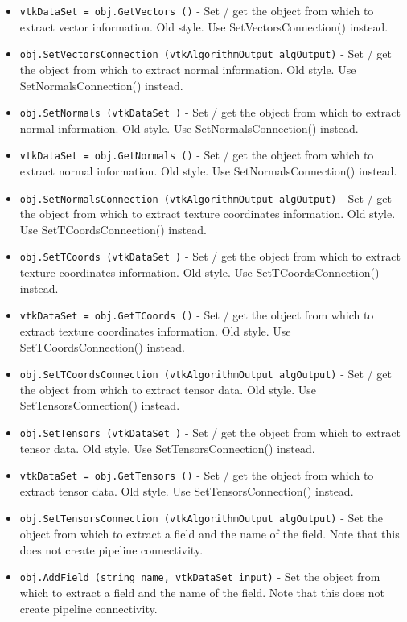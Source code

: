 \begin{itemize}
\item  \verb|vtkDataSet = obj.GetVectors ()| -  Set / get the object from which to extract vector information.
 Old style. Use SetVectorsConnection() instead.

\item  \verb|obj.SetVectorsConnection (vtkAlgorithmOutput algOutput)| -  Set / get the object from which to extract normal information.
 Old style. Use SetNormalsConnection() instead.

\item  \verb|obj.SetNormals (vtkDataSet )| -  Set / get the object from which to extract normal information.
 Old style. Use SetNormalsConnection() instead.

\item  \verb|vtkDataSet = obj.GetNormals ()| -  Set / get the object from which to extract normal information.
 Old style. Use SetNormalsConnection() instead.

\item  \verb|obj.SetNormalsConnection (vtkAlgorithmOutput algOutput)| -  Set / get the object from which to extract texture coordinates
 information.
 Old style. Use SetTCoordsConnection() instead.

\item  \verb|obj.SetTCoords (vtkDataSet )| -  Set / get the object from which to extract texture coordinates
 information.
 Old style. Use SetTCoordsConnection() instead.

\item  \verb|vtkDataSet = obj.GetTCoords ()| -  Set / get the object from which to extract texture coordinates
 information.
 Old style. Use SetTCoordsConnection() instead.

\item  \verb|obj.SetTCoordsConnection (vtkAlgorithmOutput algOutput)| -  Set / get the object from which to extract tensor data.
 Old style. Use SetTensorsConnection() instead.

\item  \verb|obj.SetTensors (vtkDataSet )| -  Set / get the object from which to extract tensor data.
 Old style. Use SetTensorsConnection() instead.

\item  \verb|vtkDataSet = obj.GetTensors ()| -  Set / get the object from which to extract tensor data.
 Old style. Use SetTensorsConnection() instead.

\item  \verb|obj.SetTensorsConnection (vtkAlgorithmOutput algOutput)| -  Set the object from which to extract a field and the name
 of the field. Note that this does not create pipeline
 connectivity.

\item  \verb|obj.AddField (string name, vtkDataSet input)| -  Set the object from which to extract a field and the name
 of the field. Note that this does not create pipeline
 connectivity.

\end{itemize}

